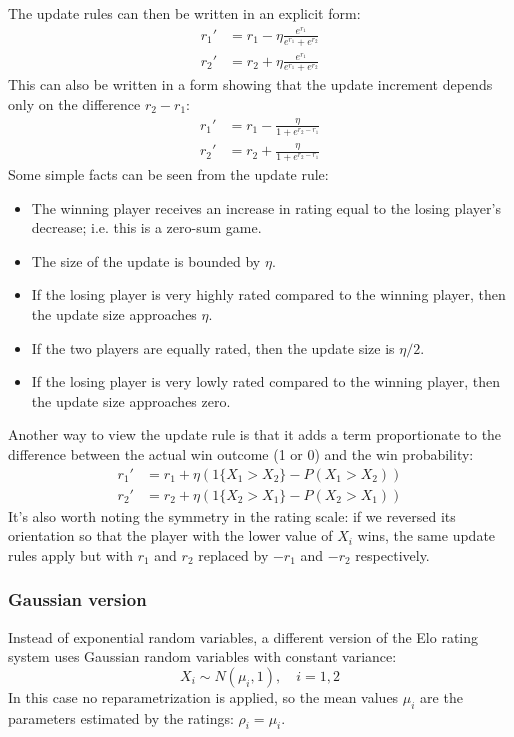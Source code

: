 \documentclass{article}
\begin{document}
	The update rules can then be written in an explicit form:
	\begin{align*}
	r_1' &= r_1 - \eta\frac{e^{r_1}}{e^{r_1} + e^{r_2}} \\
	r_2' &= r_2 + \eta\frac{e^{r_1}}{e^{r_1} + e^{r_2}} 
	\end{align*}
	This can also be written in a form showing that the update increment depends only on the difference $r_2 - r_1$:
	\begin{align*}
	r_1' &= r_1 - \frac{\eta}{1 + e^{r_2 - r_1}} \\
	r_2' &= r_2 + \frac{\eta}{1 + e^{r_2 - r_1}} 
	\end{align*}
	Some simple facts can be seen from the update rule: 
	\begin{itemize}
		\item The winning player receives an increase in rating equal to the losing player's decrease; i.e. this is a zero-sum game.
		\item The size of the update is bounded by $\eta$.
		\item If the losing player is very highly rated compared to the winning player, then the update size approaches $\eta$.
		\item If the two players are equally rated, then the update size is $\eta / 2$.
		\item If the losing player is very lowly rated compared to the winning player, then the update size approaches zero. 
	\end{itemize}
	Another way to view the update rule is that it adds a term proportionate to the difference between the actual win outcome (1 or 0) and the win probability:
	\begin{align*}
	r_1' &= r_1 + \eta(1\{X_1 > X_2\} - P(X_1 > X_2)) \\
	r_2' &= r_2 + \eta(1\{X_2 > X_1\} - P(X_2 > X_1))
	\end{align*}
	It's also worth noting the symmetry in the rating scale: if we reversed its orientation so that the player with the lower value of $X_i$ wins,
	the same update rules apply but with $r_1$ and $r_2$ replaced by $-r_1$ and $-r_2$ respectively.
	
	\subsubsection{Gaussian version}
	
	Instead of exponential random variables, a different version of the Elo rating system uses Gaussian random variables with constant variance:
	$$X_i \sim N(\mu_i, 1),\quad i=1, 2$$
	In this case no reparametrization is applied, so the mean values $\mu_i$ are the parameters estimated by the ratings: $\rho_i = \mu_i$.
	
\end{document}
